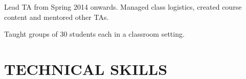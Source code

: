 \documentclass[margin, 11pt]{res} %
\begin{document}
\begin{resume}
\begin{itemize} \itemsep -2pt
{\small \item Lead TA from Spring 2014 onwards. Managed class logistics, created course content and mentored other TAs.
\item Taught groups of 30 students each in a classroom setting.}%
\end{itemize}







\section{TECHNICAL SKILLS}


\end{resume}
\end{document}
